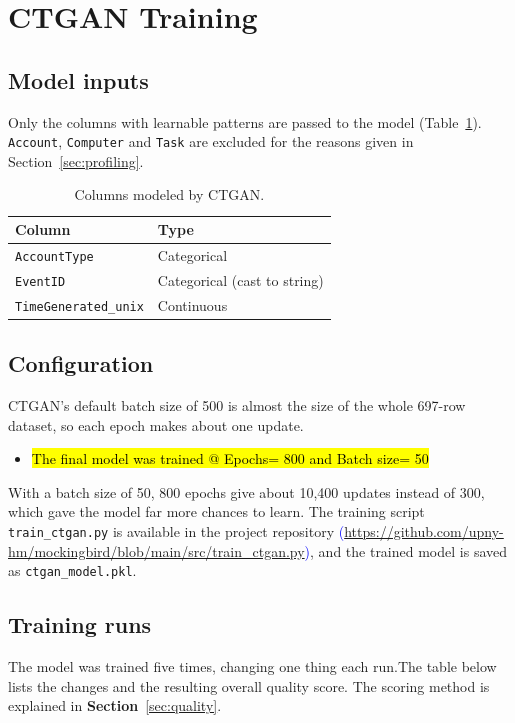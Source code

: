 \documentclass[11pt,a4paper]{article}
\begin{document}
\section{CTGAN Training}\label{sec:training}

\subsection{Model inputs}
Only the columns with learnable patterns are passed to the model (Table~\ref{tab:inputs}). \texttt{Account}, \texttt{Computer} and \texttt{Task} are excluded for the reasons given in Section~\ref{sec:profiling}.

\begin{table}[H]
\centering
\small
\renewcommand{\arraystretch}{1.25}
\begin{tabular}{@{}>{\raggedright\arraybackslash}p{4.2cm}>{\raggedright\arraybackslash}p{5cm}@{}}
\toprule
\textbf{Column} & \textbf{Type}\\
\midrule
\texttt{AccountType} & Categorical\\
\texttt{EventID} & Categorical (cast to string)\\
\texttt{TimeGenerated\_unix} & Continuous\\
\bottomrule
\end{tabular}
\caption{Columns modeled by CTGAN.}\label{tab:inputs}
\end{table}

\subsection{Configuration}


CTGAN's default batch size of 500 is almost the size of the whole 697-row dataset, so each epoch makes about one update. 
\begin{itemize}
    \item \hl{The final model was trained @ Epochs= 800 and Batch size= 50}
\end{itemize}
With a batch size of 50, 800 epochs give about 10,400 updates instead of 300, which gave the model far more chances to learn. The training script \texttt{train\_ctgan.py} is available in the project repository \textcolor{blue}{(\url{https://github.com/upny-hm/mockingbird/blob/main/src/train_ctgan.py})}, and the trained model is saved as \texttt{ctgan\_model.pkl}.

\subsection{Training runs}
The model was trained five times, changing one thing each run.The table below lists the changes and the resulting overall quality score. The scoring method is explained in \textbf{Section}~\ref{sec:quality}.
\end{document}

